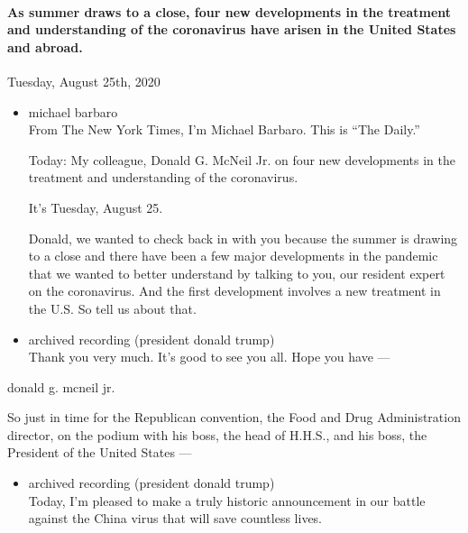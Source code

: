 \hypertarget{as-summer-draws-to-a-close-four-new-developments-in-the-treatment-and-understanding-of-the-coronavirus-have-arisen-in-the-united-states-and-abroad-2}{%
\paragraph{As summer draws to a close, four new developments in the
treatment and understanding of the coronavirus have arisen in the United
States and
abroad.}\label{as-summer-draws-to-a-close-four-new-developments-in-the-treatment-and-understanding-of-the-coronavirus-have-arisen-in-the-united-states-and-abroad-2}}

Tuesday, August 25th, 2020

\begin{itemize}
\item
  michael barbaro\\
  From The New York Times, I'm Michael Barbaro. This is ``The Daily.''

  Today: My colleague, Donald G. McNeil Jr. on four new developments in
  the treatment and understanding of the coronavirus.

  It's Tuesday, August 25.

  Donald, we wanted to check back in with you because the summer is
  drawing to a close and there have been a few major developments in the
  pandemic that we wanted to better understand by talking to you, our
  resident expert on the coronavirus. And the first development involves
  a new treatment in the U.S. So tell us about that.
\item
  archived recording (president donald trump)\\
  Thank you very much. It's good to see you all. Hope you have ---
\end{itemize}

donald g. mcneil jr.

So just in time for the Republican convention, the Food and Drug
Administration director, on the podium with his boss, the head of
H.H.S., and his boss, the President of the United States ---

\begin{itemize}
\tightlist
\item
  archived recording (president donald trump)\\
  Today, I'm pleased to make a truly historic announcement in our battle
  against the China virus that will save countless lives.
\end{itemize}

